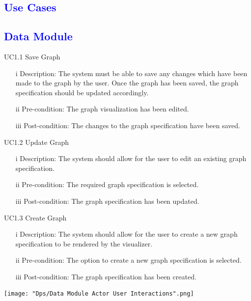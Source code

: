 \documentclass[12pt]{article}
\begin{document}
\textcolor{blue}{\section{Use Cases}}
\textcolor{blue}{\subsection{Data Module}}
\begin{flushleft}
UC1.1 Save Graph
\begin{itemize}
\item[i] Description: The system must be able to save any changes which have been made to the graph by the user. Once the graph has been saved, the graph specification should be updated accordingly.
\item[ii] Pre-condition: The graph visualization has been edited.
\item[iii] Post-condition: The changes to the graph specification have been saved.
\end{itemize}
\end{flushleft}

\bigskip

\begin{flushleft}
UC1.2 Update Graph
\begin{itemize}
\item[i] Description: The system should allow for the user to edit an existing graph specification.
\item[ii]	Pre-condition: The required graph specification is selected.
\item[iii] Post-condition: The graph specification has been updated.
\end{itemize}
\end{flushleft}

\bigskip

\begin{flushleft}
UC1.3 Create Graph
\begin{itemize}
\item[i] Description: The system should allow for the user to create a new graph specification to be rendered by the visualizer.
\item[ii] Pre-condition: The option to create a new graph specification is selected.
\item[iii] Post-condition: The graph specification has been created.
\end{itemize}
\end{flushleft}

\texttt{[image: "Dps/Data Module Actor User Interactions".png]}
\end{document}
